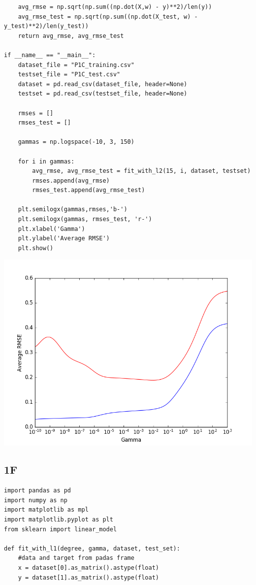 \documentclass[12pt]{article}
\begin{document}
\begin{flushleft}
\begin{lstlisting}
	avg_rmse = np.sqrt(np.sum((np.dot(X,w) - y)**2)/len(y))
	avg_rmse_test = np.sqrt(np.sum((np.dot(X_test, w) - y_test)**2)/len(y_test))
	return avg_rmse, avg_rmse_test

if __name__ == "__main__":
	dataset_file = "P1C_training.csv"
	testset_file = "P1C_test.csv"
	dataset = pd.read_csv(dataset_file, header=None)
	testset = pd.read_csv(testset_file, header=None)
	
	rmses = []
	rmses_test = []
	
	gammas = np.logspace(-10, 3, 150)
	
	for i in gammas:
		avg_rmse, avg_rmse_test = fit_with_l2(15, i, dataset, testset)
		rmses.append(avg_rmse)
		rmses_test.append(avg_rmse_test)
	
	plt.semilogx(gammas,rmses,'b-')
	plt.semilogx(gammas, rmses_test, 'r-')
	plt.xlabel('Gamma')
	plt.ylabel('Average RMSE')
	plt.show()
\end{lstlisting}
		\includegraphics[scale=0.5]{HW1_1E.png}
		\label{fig:graph 1E}
		
		\subsection*{1F}
\begin{lstlisting}
import pandas as pd
import numpy as np
import matplotlib as mpl
import matplotlib.pyplot as plt
from sklearn import linear_model

def fit_with_l1(degree, gamma, dataset, test_set):
	#data and target from padas frame
	x = dataset[0].as_matrix().astype(float)
	y = dataset[1].as_matrix().astype(float)
	

\end{lstlisting}
\end{flushleft}
\end{document}
